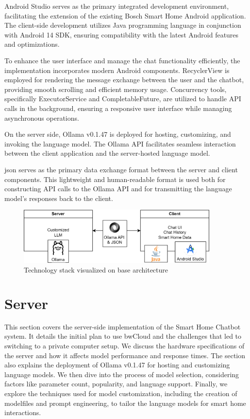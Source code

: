 Android Studio serves as the primary integrated development environment, facilitating the extension of the existing Bosch Smart Home Android application. The client-side development utilizes Java programming language in conjunction with Android 14 SDK, ensuring compatibility with the latest Android features and optimizations.

To enhance the user interface and manage the chat functionality efficiently, the implementation incorporates modern Android components. RecyclerView is employed for rendering the message exchange between the user and the chatbot, providing smooth scrolling and efficient memory usage. Concurrency tools, specifically ExecutorService and CompletableFuture, are utilized to handle API calls in the background, ensuring a responsive user interface while managing asynchronous operations.

On the server side, Ollama v0.1.47 is deployed for hosting, customizing, and invoking the language model. The Ollama API facilitates seamless interaction between the client application and the server-hosted language model.

\gls{json} serves as the primary data exchange format between the server and client components. This lightweight and human-readable format is used both for constructing API calls to the Ollama API and for transmitting the language model's responses back to the client.
\begin{figure}[h]
    \centering
    \captionsetup{justification=centering}
    \includegraphics[width=0.9\textwidth]{graphics/techstack.png}
    \caption{Technology stack visualized on base architecture}
    \label{fig:techstack}
\end{figure}

\section{Server}
This section covers the server-side implementation of the Smart Home Chatbot system. 
It details the initial plan to use bwCloud and the challenges that led to switching to a private computer setup. 
We discuss the hardware specifications of the server and how it affects model performance and response times. 
The section also explains the deployment of Ollama v0.1.47 for hosting and customizing language models. 
We then dive into the process of model selection, considering factors like parameter count, popularity, and language support. 
Finally, we explore the techniques used for model customization, including the creation of modelfiles and prompt engineering, to tailor the language models for smart home interactions.


